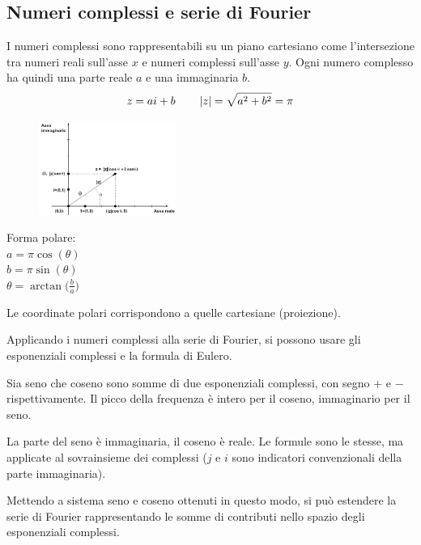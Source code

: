 \subsection{Numeri complessi e serie di Fourier}
I numeri complessi sono rappresentabili su un piano cartesiano come l'intersezione tra numeri reali sull'asse $x$ e numeri complessi sull'asse $y$. Ogni numero complesso ha quindi una parte reale $a$ e una immaginaria $b$.
$$z = ai+b \qquad \left|z\right| = \sqrt{a^2 + b^2} = \pi$$

\begin{figure}
	\vspace{-15pt}
		\includegraphics[width=0.4\textwidth]{Lezioni/Immagini/cartesiano}
	\vspace{-30pt}
\end{figure}

Forma polare:  \\ 
$a = \pi\cos(\theta)$ \\ 
$b = \pi\sin(\theta)$ \\ 
$\theta = \arctan\Big(\frac{b}{a}\Big)$

Le coordinate polari corrispondono a quelle cartesiane (proiezione). 

Applicando i numeri complessi alla serie di Fourier, si possono usare gli esponenziali complessi e la formula di Eulero. 

Sia seno che coseno sono somme di due esponenziali complessi, con segno $+$ e $-$ rispettivamente. Il picco della frequenza è intero per il coseno, immaginario per il seno. 

La parte del seno è immaginaria, il coseno è reale. Le formule sono le stesse, ma applicate al sovrainsieme dei complessi ($j$ e $i$ sono indicatori convenzionali della parte immaginaria).

Mettendo a sistema seno e coseno ottenuti in questo modo, si può estendere la serie di Fourier rappresentando le somme di contributi nello spazio degli esponenziali complessi.

